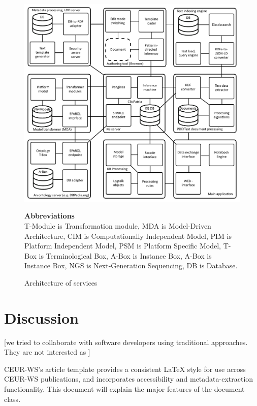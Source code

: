 \documentclass[
]{ceurart}
\begin{document}
\begin{figure}[bth]
  \begin{center}
    \includegraphics[width=0.9\linewidth]{architecture-mda-lod-ext-general.pdf}
  \end{center}
  \begin{center}
      \textbf{Abbreviations}\\[1ex]\scriptsize
      T-Module is Transformation module,
      MDA is Model-Driven Architecture,
      CIM is Computationally Independent Model,
      PIM is Platform Independent Model,
      PSM is Platform Specific Model,
      T-Box is Terminological Box,
      A-Box is Instance Box,
      A-Box is Instance Box,
      NGS is Next-Generation Sequencing,
      DB is Database.
  \end{center}

  \caption{Architecture of services}
  \label{fig:arch-services}
\end{figure}


\section{Discussion}
\label{sec:disc}


[we tried to collaborate with software developers using traditional approaches.  They are not interested as ]


CEUR-WS's article template provides a consistent \LaTeX{} style for
use across CEUR-WS publications, and incorporates accessibility and
metadata-extraction functionality. This document will explain the
major features of the document class.
\end{document}
